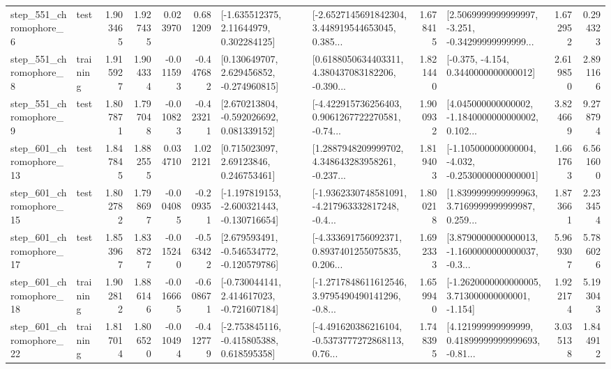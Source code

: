 \begin{tabular}{llrrrrllrlrr}
   step\_551\_chromophore\_6 &      test &      1.903465 &    1.927435 &      0.023970 &  0.681209 &     [-1.635512375, 2.11644979, 0.302284125] &  [-2.6527145691842304, 3.448919544653045, 0.385... &       1.678415 &  [2.5069999999999997, -3.251, -0.34299999999999... &            1.672952 &          0.294323 \\
   step\_551\_chromophore\_8 &  training &      1.915927 &    1.904334 &     -0.011593 & -0.447682 &    [0.130649707, 2.629456852, -0.274960815] &  [0.6188050634403311, 4.380437083182206, -0.390... &       1.821440 &               [-0.375, -4.154, 0.3440000000000012] &            2.619850 &          2.891166 \\
   step\_551\_chromophore\_9 &      test &      1.807871 &    1.797048 &     -0.010823 & -0.423211 &    [2.670213804, -0.592026692, 0.081339152] &  [-4.422915736256403, 0.9061267722270581, -0.74... &       1.900932 &  [4.045000000000002, -1.1840000000000002, 0.102... &            3.824669 &          9.278794 \\
  step\_601\_chromophore\_13 &      test &      1.847845 &    1.882555 &      0.034710 &  1.022121 &      [0.715023097, 2.69123846, 0.246753461] &  [1.2887948209999702, 4.348643283958261, -0.237... &       1.819403 &  [-1.105000000000004, -4.032, -0.2530000000000001] &            1.661763 &          6.561600 \\
  step\_601\_chromophore\_15 &      test &      1.802782 &    1.798697 &     -0.004085 & -0.209351 &  [-1.197819153, -2.600321443, -0.130716654] &  [-1.9362330748581091, -4.217963332817248, -0.4... &       1.800218 &  [1.8399999999999963, 3.7169999999999987, 0.259... &            1.873661 &          2.233454 \\
  step\_601\_chromophore\_17 &      test &      1.853967 &    1.838727 &     -0.015240 & -0.563422 &   [2.679593491, -0.546534772, -0.120579786] &  [-4.333691756092371, 0.8937401255075835, 0.206... &       1.692333 &  [3.8790000000000013, -1.1600000000000037, -0.3... &            5.969307 &          5.786026 \\
  step\_601\_chromophore\_18 &  training &      1.902812 &    1.886146 &     -0.016665 & -0.608671 &   [-0.730044141, 2.414617023, -0.721607184] &  [-1.2717848611612546, 3.9795490490141296, -0.8... &       1.659940 &   [-1.2620000000000005, 3.713000000000001, -1.154] &            1.922174 &          5.193043 \\
  step\_601\_chromophore\_22 &  training &      1.817014 &    1.806520 &     -0.010494 & -0.412779 &   [-2.753845116, -0.415805388, 0.618595358] &  [-4.491620386216104, -0.5373777272868113, 0.76... &       1.748395 &  [4.121999999999999, 0.41899999999999693, -0.81... &            3.035138 &          1.844912 \\

\end{tabular}
